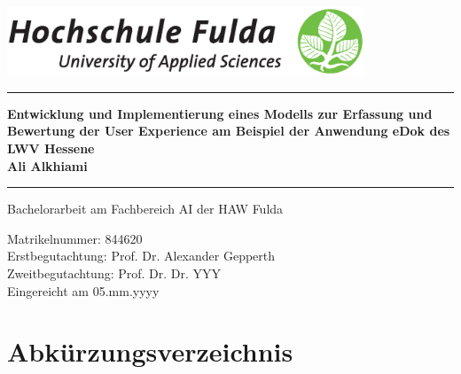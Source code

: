\documentclass[12pt,oneside]{article}
\newcommand{\HSFTitle}[8]{

  \thispagestyle{empty}
\begin{center}
    \includegraphics[width=0.8\textwidth]{logo.eps} \\
    \vspace*{\stretch{1}}
    \end{center}

  {\parindent0cm
  \rule{\linewidth}{.7ex}}
  \begin{center}
    \vspace*{\stretch{1}}
    \sffamily\bfseries\Huge
    #1\\
    \vspace*{\stretch{1}}
    \sffamily\bfseries\large
    #3
    \vspace*{\stretch{1}}
  \end{center}
  \rule{\linewidth}{.7ex}

  \vspace*{\stretch{2}}
  \begin{center}
    \Large #2 am #5 der HAW Fulda \\
    \vspace*{\stretch{1}}

    \large Matrikelnummer:  #4 \\[1mm]
    \large Erstbegutachtung:  #7 \\[1mm]
    \large Zweitbegutachtung:  #8 \\[1mm]

    \vspace*{\stretch{1}}
    \large Eingereicht am #6
  \end{center}
}
\begin{document}
 
 

 \HSFTitle
      {Entwicklung und Implementierung eines Modells zur Erfassung und Bewertung der User Experience am Beispiel der Anwendung eDok des LWV Hessene }        %
      {Bachelorarbeit} %
      {Ali Alkhiami}          %
      {844620}
      {Fachbereich AI}  %
      {05.mm.yyyy}        %
      {Prof. Dr. Alexander Gepperth}     %
      {Prof. Dr. Dr. YYY}    %

  \clearpage

\lhead{}
    \setcounter{page}{1}
\tableofcontents
\section{Abkürzungsverzeichnis}
\begin{acronym}[hyperlinks]
\end{acronym}
\end{document}
